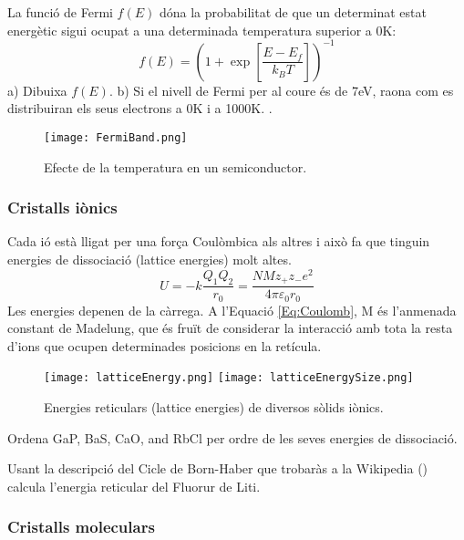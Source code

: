 \begin{exr}
La funció de Fermi $f(E)$ dóna la probabilitat de que un determinat estat energètic sigui ocupat a una determinada temperatura superior a 0K:
\[f(E)=\left( 1 + \exp \left[ \frac{E-E_f}{k_B T} \right] \right)^{-1}\]
a) Dibuixa $f(E)$. b) Si el nivell de Fermi per al coure és de 7eV, raona com es distribuiran els seus electrons a 0K i a 1000K.
\label{Ex:Fermi}.
\end{exr}

\begin{figure}[h]
\centering
\texttt{[image: FermiBand.png]}
\caption{Efecte de la temperatura en un semiconductor.}
\label{fig:FermiBand}
\end{figure}

\subsubsection{Cristalls iònics}
 Cada ió està lligat per una força Coulòmbica als altres i això fa que tinguin energies de dissociació (lattice energies) molt altes. 
\begin{equation}
U=-k\frac{Q_1 Q_2}{r_0} = \frac{NMz_+z_-e^2}{4\pi \varepsilon_0 r_0}
\label{Eq:Coulomb}
\end{equation}
Les energies depenen de la càrrega.
A l'Equació \ref{Eq:Coulomb}, M és l'anmenada constant de Madelung, que és fruït de considerar la interacció amb tota la resta d'ions que ocupen determinades posicions en la retícula.
\begin{figure}[h]
\centering
\texttt{[image: latticeEnergy.png]}
\texttt{[image: latticeEnergySize.png]}
\caption{Energies reticulars (lattice energies) de diversos sòlids iònics.}
\label{fig:latticeEnergy}
\end{figure}
\begin{exr}
Ordena GaP, BaS, CaO, and RbCl per ordre de les seves energies de dissociació.
\end{exr}

\begin{exr}
Usant la descripció del Cicle de Born-Haber que trobaràs a la Wikipedia () calcula l'energia reticular del Fluorur de Liti.
\end{exr}

\subsubsection{Cristalls moleculars}

